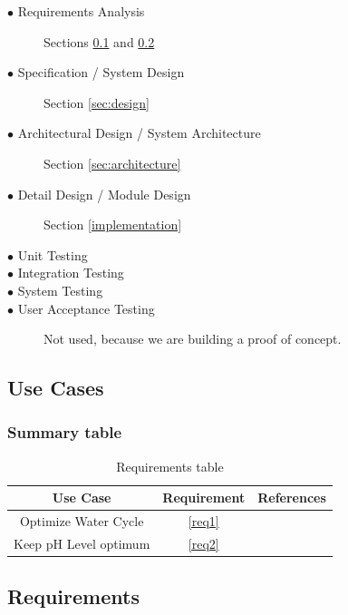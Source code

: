 \begin{description}
    \item[$\bullet$ Requirements Analysis] Sections \ref{sec:useCases} and \ref{sec:requirements}
    \item[$\bullet$ Specification / System Design] Section \ref{sec:design}
    \item[$\bullet$ Architectural Design / System Architecture] Section  \ref{sec:architecture}
    \item[$\bullet$ Detail Design / Module Design] Section \ref{implementation}
    \item[$\bullet$ Unit Testing] 
    \item[$\bullet$ Integration Testing] 
    \item[$\bullet$ System Testing] 
    \item[$\bullet$ User Acceptance Testing] Not used, because we are building a proof of concept.
\end{description}


\subsection{Use Cases}
\label{sec:useCases}



\subsubsection{Summary table}

\begin{table}[h]
\centering
\caption{Requirements table}
\label{tab:requirementsTable}
\begin{tabular}{|c|c|c|}
\hline
\textbf{Use Case}    & \textbf{Requirement} & \textbf{References} \\ \hline
Optimize Water Cycle & \ref{req1}           &                 \\ \hline
Keep pH Level optimum & \ref{req2}           &  \cite{tables} \\ \hline
\end{tabular}
\end{table}

\subsection{Requirements}
\label{sec:requirements}


